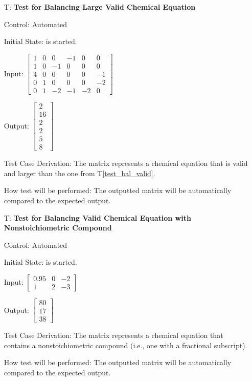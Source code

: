 \documentclass[12pt, titlepage]{article}
\newcounter{testnum} %
\newcommand{\testref}[1]{T\ref{#1}}
\begin{document}
\begin{enumerate}
  \item[T\refstepcounter{testnum}\thetestnum \label{test_bal_large_valid}:]
    \textbf{Test for Balancing Large Valid Chemical Equation}

    Control: Automated

    Initial State: \progname{} is started.

    Input: $\begin{bmatrix}
        1 & 0 & 0  & -1 & 0  & 0  \\
        1 & 0 & -1 & 0  & 0  & 0  \\
        4 & 0 & 0  & 0  & 0  & -1 \\
        0 & 1 & 0  & 0  & 0  & -2 \\
        0 & 1 & -2 & -1 & -2 & 0
      \end{bmatrix}$

    Output: $\begin{bmatrix}
        2  \\
        16 \\
        2  \\
        2  \\
        5  \\
        8
      \end{bmatrix}$

    Test Case Derivation: The matrix represents a chemical equation that is
    valid and larger than the one from \testref{test_bal_valid}.

    How test will be performed: The outputted matrix will be automatically
    compared to the expected output.

  \item[T\refstepcounter{testnum}\thetestnum \label{test_bal_nonstoich_valid}:]
    \textbf{Test for Balancing Valid Chemical Equation with
      Nonstoichiometric Compound}

    Control: Automated

    Initial State: \progname{} is started.

    Input:
    $\begin{bmatrix}
        0.95 & 0 & -2 \\
        1    & 2 & -3
      \end{bmatrix}$

    Output:  $\begin{bmatrix}
        80 \\
        17 \\
        38
      \end{bmatrix}$

    Test Case Derivation: The matrix represents a chemical equation that
    contains a nonstoichiometric compound (i.e., one with a fractional
    subscript).

    How test will be performed: The outputted matrix will be automatically
    compared to the expected output.

\end{enumerate}
\end{document}
